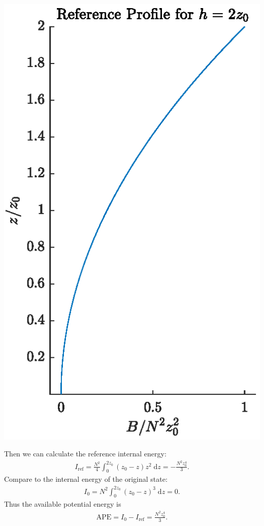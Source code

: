 \documentclass[11pt,letterpaper]{book}
\theoremstyle{definition}
\newcommand{\de}{\mathrm{d}}
\newcommand{\APE}{\text{APE}}
\begin{document}
\begin{center}
\includegraphics[scale=1]{Fig/heq2z0}
\end{center}
Then we can calculate the reference internal energy:
\begin{align*}
I_\text{ref} = \frac{N^2}{4}\int^{2z_0}_0 (z_0-z)z^2\;\de z = -\frac{N^2 z_0^4}{3}.
\end{align*}
Compare to the internal energy of the original state:
\begin{align*}
I_0 = {N^2}\int^{2z_0}_0 (z_0-z)^3\;\de z = 0.
\end{align*}
Thus the available potential energy is 
\begin{align*}
\APE = I_0-I_\text{ref} = \frac{N^2 z_0^4}{3}.
\end{align*}
\end{document}
